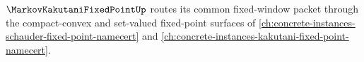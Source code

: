 $\MarkovKakutaniFixedPointUp$ routes its common fixed-window packet through the compact-convex and set-valued fixed-point surfaces of \autoref{ch:concrete-instances-schauder-fixed-point-namecert} and \autoref{ch:concrete-instances-kakutani-fixed-point-namecert}.



